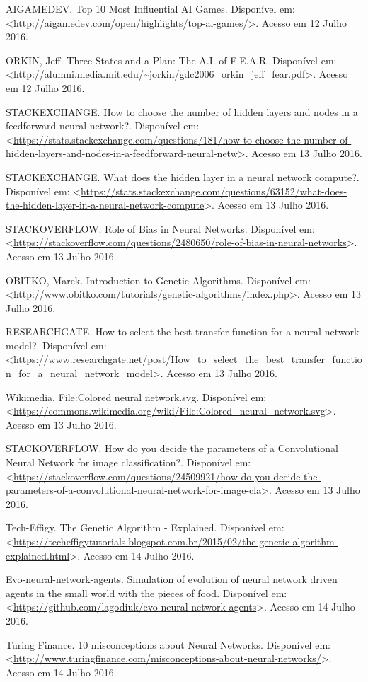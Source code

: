 \documentclass[12pt,a4paper]{article}
\begin{document}
	AIGAMEDEV. Top 10 Most Influential AI Games. Disponível em: \textless \url{http://aigamedev.com/open/highlights/top-ai-games/}\textgreater. Acesso em 12 Julho 2016.\par
	ORKIN, Jeff. Three States and a Plan: The A.I. of F.E.A.R. Disponível em: \textless \url{http://alumni.media.mit.edu/~jorkin/gdc2006_orkin_jeff_fear.pdf}\textgreater. Acesso em 12 Julho 2016.\par
	STACKEXCHANGE. How to choose the number of hidden layers and nodes in a feedforward neural network?. Disponível em: \textless \url{https://stats.stackexchange.com/questions/181/how-to-choose-the-number-of-hidden-layers-and-nodes-in-a-feedforward-neural-netw}\textgreater. Acesso em 13 Julho 2016.\par
	STACKEXCHANGE. What does the hidden layer in a neural network compute?. Disponível em: \textless \url{https://stats.stackexchange.com/questions/63152/what-does-the-hidden-layer-in-a-neural-network-compute}\textgreater. Acesso em 13 Julho 2016.\par
	STACKOVERFLOW. Role of Bias in Neural Networks. Disponível em: \textless \url{https://stackoverflow.com/questions/2480650/role-of-bias-in-neural-networks}\textgreater. Acesso em 13 Julho 2016.\par
	OBITKO, Marek. Introduction to Genetic Algorithms. Disponível em: \textless \url{http://www.obitko.com/tutorials/genetic-algorithms/index.php}\textgreater. Acesso em 13 Julho 2016.\par
	RESEARCHGATE. How to select the best transfer function for a neural network model?. Disponível em: \textless \url{https://www.researchgate.net/post/How_to_select_the_best_transfer_function_for_a_neural_network_model}\textgreater. Acesso em 13 Julho 2016.\par
	Wikimedia. File:Colored neural network.svg. Disponível em: \textless \url{https://commons.wikimedia.org/wiki/File:Colored_neural_network.svg}\textgreater. Acesso em 13 Julho 2016.\par
	STACKOVERFLOW. How do you decide the parameters of a Convolutional Neural Network for image classification?. Disponível em: \textless \url{https://stackoverflow.com/questions/24509921/how-do-you-decide-the-parameters-of-a-convolutional-neural-network-for-image-cla}\textgreater. Acesso em 13 Julho 2016.\par
	Tech-Effigy. The Genetic Algorithm - Explained. Disponível em: \textless \url{https://techeffigytutorials.blogspot.com.br/2015/02/the-genetic-algorithm-explained.html}\textgreater. Acesso em 14 Julho 2016.\par
	Evo-neural-network-agents. Simulation of evolution of neural network driven agents in the small world with the pieces of food. Disponível em: \textless \url{https://github.com/lagodiuk/evo-neural-network-agents}\textgreater. Acesso em 14 Julho 2016.\par
	Turing Finance. 10 misconceptions about Neural Networks. Disponível em: \textless \url{http://www.turingfinance.com/misconceptions-about-neural-networks/}\textgreater. Acesso em 14 Julho 2016.\par
\end{document}
